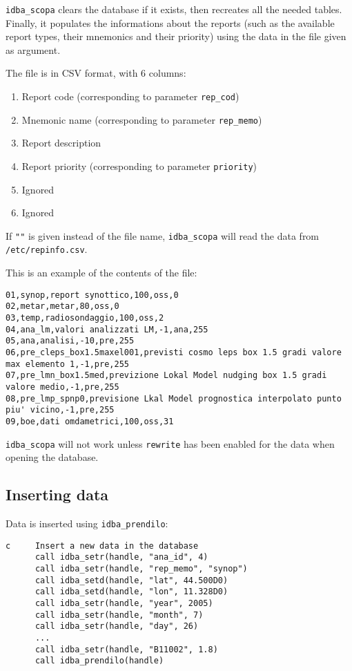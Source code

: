 \documentclass[final,12pt,a4paper,twoside]{book}
\begin{document}
{\tt idba\_scopa} clears the database if it exists, then recreates all the
needed tables.  Finally, it populates the informations about the reports (such
as the available report types, their mnemonics and their priority) using the
data in the file given as argument.

The file is in CSV format, with 6 columns:
\begin{enumerate}
\item Report code (corresponding to parameter {\tt rep\_cod})
\item Mnemonic name (corresponding to parameter {\tt rep\_memo})
\item Report description
\item Report priority (corresponding to parameter {\tt priority})
\item Ignored
\item Ignored
\end{enumerate}

If {\tt ""} is given instead of the file name, {\tt idba\_scopa} will read the
data from {\tt /etc/repinfo.csv}.

This is an example of the contents of the file:

\begin{verbatim}
01,synop,report synottico,100,oss,0
02,metar,metar,80,oss,0
03,temp,radiosondaggio,100,oss,2
04,ana_lm,valori analizzati LM,-1,ana,255
05,ana,analisi,-10,pre,255
06,pre_cleps_box1.5maxel001,previsti cosmo leps box 1.5 gradi valore max elemento 1,-1,pre,255
07,pre_lmn_box1.5med,previzione Lokal Model nudging box 1.5 gradi valore medio,-1,pre,255
08,pre_lmp_spnp0,previsione Lkal Model prognostica interpolato punto piu' vicino,-1,pre,255
09,boe,dati omdametrici,100,oss,31
\end{verbatim}

{\tt idba\_scopa} will not work unless {\tt rewrite} has been enabled for the
data when opening the database.


\subsection {Inserting data}

Data is inserted using {\tt idba\_prendilo}:
\label{fun-idba_prendilo}
         
\begin{verbatim}
c     Insert a new data in the database
      call idba_setr(handle, "ana_id", 4)
      call idba_setr(handle, "rep_memo", "synop")
      call idba_setd(handle, "lat", 44.500D0)
      call idba_setd(handle, "lon", 11.328D0)
      call idba_setr(handle, "year", 2005)
      call idba_setr(handle, "month", 7)
      call idba_setr(handle, "day", 26)
      ...
      call idba_setr(handle, "B11002", 1.8)
      call idba_prendilo(handle)
\end{verbatim}
\end{document}
